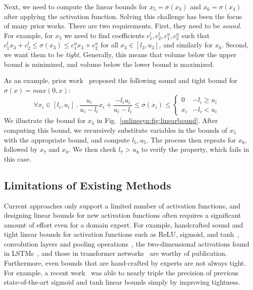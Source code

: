 Next, we need to compute the linear bounds for $ x_5 = \sigma(x_3) $ and $ x_6
= \sigma(x_4) $ after
applying the activation function. Solving this challenge has been the focus of
many prior works. There are two requirements. First, they need to be
\textit{sound}. For example, for $ x_5 $ we need to find coefficients $
c_1^l,c_2^l,c_1^u,c_2^u $ such that
$c_1^l x_3 + c_2^l
\leq \sigma(x_3) \leq c_1^ux_3 + c_2^u $ for all $x_3 \in [l_3, u_3]$, and similarly for $ x_6 $. Second, we
want them to be \textit{tight}. Generally, this means that volume below the
upper bound is minimized, and volume below the lower bound is maximized.


As an example, prior work~\cite{SinghGPV19,zhang2018efficient} proposed the following sound and
tight bound for $ \sigma(x) = max(0, x) $:
\[
	\forall x_i \in [l_i, u_i] ~.~ \frac{u_i}{u_i - l_i}x_i +
	\frac{-l_iu_i}{u_i-l_i} \leq \sigma(x_i)
	\leq \begin{cases}
	0 & -l_i \geq u_i\\
	x_i & -l_i < u_i
	\end{cases}
\]
We illustrate the bound for $ x_5 $ in Fig.~\ref{onlinesyn:fig:linearbound}. After
computing this bound, we recursively substitute variables in the
bounds of $ x_5 $ with the appropriate bound, and compute $ l_5, u_5 $. The
process then repeats for $ x_6 $, followed by $ x_7 $ and $ x_8 $. We then
check $ l_7 > u_8 $ to verify the property, which fails in this case.


\subsection{Limitations of Existing Methods}

Current approaches only support a limited number of activation functions, and
designing linear bounds for new activation functions often requires a
significant amount of effort even for a domain expert.
%
For example, handcrafted sound and
tight linear
bounds for activation functions such as ReLU, sigmoid, and
tanh~\cite{SinghGPV19,WengZCSHDBD18,zhang2018efficient,wu2021tightening,WangPWYJ18,WangPWYJ18nips},
convolution layers and pooling operations~\cite{boopathy2019cnn}, the
two-dimensional activations found in
LSTMs~\cite{ko2019popqorn,ryou2021scalable}, and those
 in transformer networks~\cite{shi2020robustness} are worthy of publication.
%
Furthermore, even bounds that are hand-crafted by experts are not always
tight. For example, a recent
work~\cite{wu2021tightening} was able to nearly triple the precision
of previous state-of-the-art sigmoid and tanh linear bounds simply by
improving tightness.

